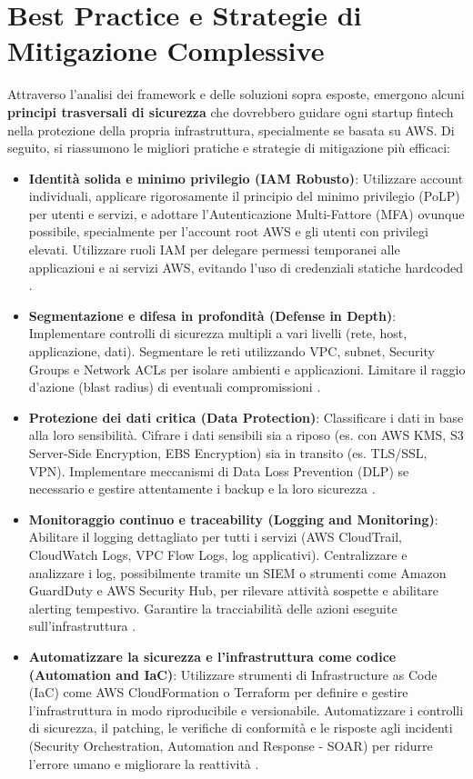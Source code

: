 \section{Best Practice e Strategie di Mitigazione Complessive}
\label{sec:best_practices}
Attraverso l'analisi dei framework e delle soluzioni sopra esposte, emergono alcuni \textbf{principi trasversali di sicurezza} che dovrebbero guidare ogni startup fintech nella protezione della propria infrastruttura, specialmente se basata su AWS. Di seguito, si riassumono le migliori pratiche e strategie di mitigazione più efficaci:
\begin{itemize}
    \item \textbf{Identità solida e minimo privilegio (IAM Robusto)}: Utilizzare account individuali, applicare rigorosamente il principio del minimo privilegio (PoLP) per utenti e servizi, e adottare l'Autenticazione Multi-Fattore (MFA) ovunque possibile, specialmente per l'account root AWS e gli utenti con privilegi elevati. Utilizzare ruoli IAM per delegare permessi temporanei alle applicazioni e ai servizi AWS, evitando l'uso di credenziali statiche hardcoded \cite{awsWellArchitected}.
    \item \textbf{Segmentazione e difesa in profondità (Defense in Depth)}: Implementare controlli di sicurezza multipli a vari livelli (rete, host, applicazione, dati). Segmentare le reti utilizzando VPC, subnet, Security Groups e Network ACLs per isolare ambienti e applicazioni. Limitare il raggio d'azione (blast radius) di eventuali compromissioni \cite{awsWellArchitected}.
    \item \textbf{Protezione dei dati critica (Data Protection)}: Classificare i dati in base alla loro sensibilità. Cifrare i dati sensibili sia a riposo (es. con AWS KMS, S3 Server-Side Encryption, EBS Encryption) sia in transito (es. TLS/SSL, VPN). Implementare meccanismi di Data Loss Prevention (DLP) se necessario e gestire attentamente i backup e la loro sicurezza \cite{awsWellArchitected}.
    \item \textbf{Monitoraggio continuo e traceability (Logging and Monitoring)}: Abilitare il logging dettagliato per tutti i servizi (AWS CloudTrail, CloudWatch Logs, VPC Flow Logs, log applicativi). Centralizzare e analizzare i log, possibilmente tramite un SIEM o strumenti come Amazon GuardDuty e AWS Security Hub, per rilevare attività sospette e abilitare alerting tempestivo. Garantire la tracciabilità delle azioni eseguite sull'infrastruttura \cite{awsWellArchitected}.
    \item \textbf{Automatizzare la sicurezza e l'infrastruttura come codice (Automation and IaC)}: Utilizzare strumenti di Infrastructure as Code (IaC) come AWS CloudFormation o Terraform per definire e gestire l'infrastruttura in modo riproducibile e versionabile. Automatizzare i controlli di sicurezza, il patching, le verifiche di conformità e le risposte agli incidenti (Security Orchestration, Automation and Response - SOAR) per ridurre l'errore umano e migliorare la reattività \cite{awsWellArchitected}.

\end{itemize}
